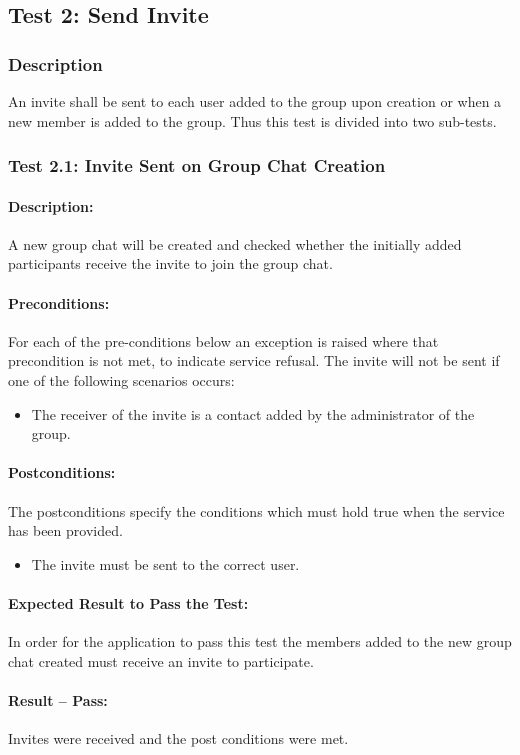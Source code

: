 \documentclass[11pt]{article}
\begin{document}
\subsection{Test 2: Send Invite}
\subsubsection{Description}
An invite shall be sent to each user added to the group upon creation or when a new member is added to the group. Thus this test is divided into two sub-tests.

\subsubsection{Test 2.1: Invite Sent on Group Chat Creation}
\paragraph{Description:}
 A new group chat will be created and checked whether the initially added participants receive the invite to join the group chat.
 \paragraph{Preconditions:}
 For each of the pre-conditions below an exception is raised where that precondition is not met, to indicate service refusal.
 The invite will not be sent if one of the following scenarios occurs:
 \begin{itemize}
 \item The receiver of the invite is a contact added by the administrator of the group.
 \end{itemize}
 \paragraph{Postconditions:} The postconditions specify the conditions which must hold true when the service has been provided.
 \begin{itemize}
 \item The invite must be sent to the correct user.
 \end{itemize}
\paragraph{Expected Result to Pass the Test:}
In order for the application to pass this test the members added to the new group chat created must receive an invite to participate.
\paragraph{Result -- Pass:}
Invites were received and the post conditions were met.
\end{document}
